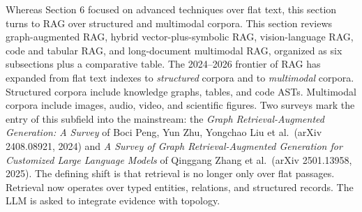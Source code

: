 Whereas Section 6 focused on advanced techniques over flat text, this section turns to RAG over structured and multimodal corpora. This section reviews graph-augmented RAG, hybrid vector-plus-symbolic RAG, vision-language RAG, code and tabular RAG, and long-document multimodal RAG, organized as six subsections plus a comparative table. The 2024--2026 frontier of RAG has expanded from flat text indexes to \emph{structured} corpora and to \emph{multimodal} corpora. Structured corpora include knowledge graphs, tables, and code ASTs. Multimodal corpora include images, audio, video, and scientific figures. Two surveys mark the entry of this subfield into the mainstream: the \emph{Graph Retrieval-Augmented Generation: A Survey} of Boci Peng, Yun Zhu, Yongchao Liu et al.~(arXiv 2408.08921, 2024) and \emph{A Survey of Graph Retrieval-Augmented Generation for Customized Large Language Models} of Qinggang Zhang et al.~(arXiv 2501.13958, 2025). The defining shift is that retrieval is no longer only over flat passages. Retrieval now operates over typed entities, relations, and structured records. The LLM is asked to integrate evidence with topology.

